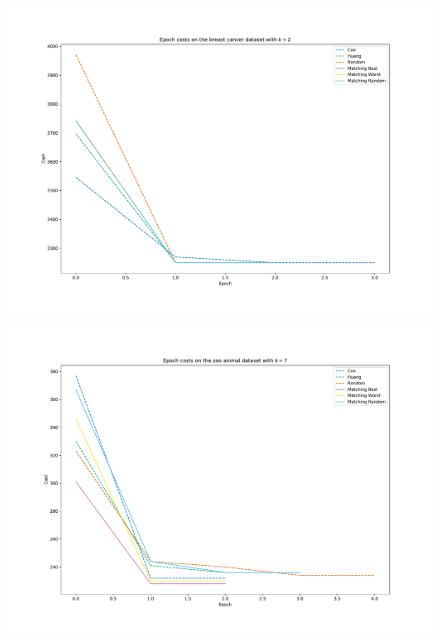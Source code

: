 \begin{figure}[h!]
    \centering
    \includegraphics[width=.8\textwidth]{./img/epoch_plot_breast_cancer.pdf}
\end{figure}

\begin{figure}[h!]
    \centering
    \includegraphics[width=.8\textwidth]{./img/epoch_plot_zoo_animal.pdf}
\end{figure}
